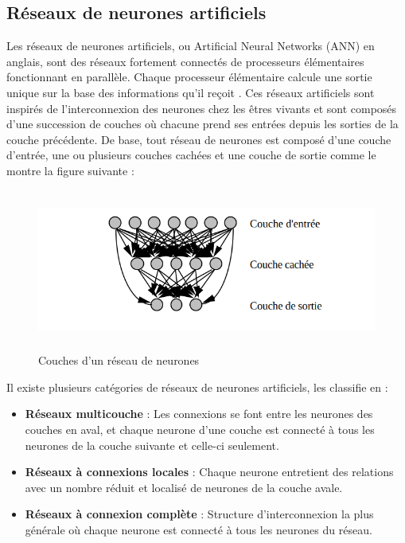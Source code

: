 \subsection{Réseaux de neurones artificiels}
Les réseaux de neurones artificiels, ou Artificial Neural Networks (ANN) en anglais, sont des réseaux fortement connectés de processeurs élémentaires fonctionnant en parallèle. Chaque processeur élémentaire calcule une sortie unique sur la base des informations qu'il reçoit \cite{neuralnetsbook}. Ces réseaux artificiels sont inspirés de l'interconnexion des neurones chez les êtres vivants et sont composés d'une succession de couches où chacune prend ses entrées depuis les sorties de la couche précédente. 
De base, tout réseau de neurones est composé d'une couche d'entrée, une ou plusieurs couches cachées et une couche de sortie comme le montre la figure suivante \cite{neuralnetsbook} : 

\begin{figure}[H]
    \centering
    \includegraphics[height=150pt,width=325pt]{images/chap2/neural_net.png}
    \caption{Couches d'un réseau de neurones}
\end{figure}

Il existe plusieurs catégories de réseaux de neurones artificiels, \cite{neuralnetsbook} les classifie en : \\
\begin{itemize}
    \item \textbf{Réseaux multicouche} : Les connexions se font entre les neurones des couches en aval, et chaque neurone d'une couche est connecté à tous les neurones de la couche suivante et celle-ci seulement.
    \item\textbf{Réseaux à connexions locales} : Chaque neurone entretient des relations avec un nombre réduit et localisé de neurones de la couche avale.
    \item \textbf{Réseaux à connexion complète} : Structure d'interconnexion la plus générale où chaque neurone est connecté à tous les neurones du réseau.
\end{itemize}


